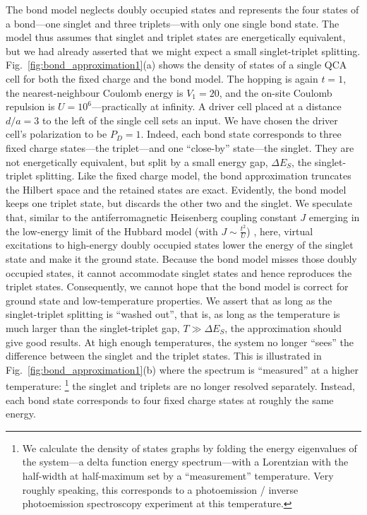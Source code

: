The bond model neglects doubly occupied states and represents the four states of
a bond---one singlet and three triplets---with only one single bond state. The
model thus assumes that singlet and triplet states are energetically equivalent,
but we had already asserted that we might expect a small singlet-triplet
splitting. Fig.~\ref{fig:bond_approximation1}(a) shows the density of states of
a single QCA cell for both the fixed charge and the bond model. The hopping is
again $t=1$, the nearest-neighbour Coulomb energy is $V_1 = 20$, and the on-site
Coulomb repulsion is $U = 10^6$---practically at infinity. A driver cell placed
at a distance $d/a = 3$ to the left of the single cell sets an input. We have
chosen the driver cell's polarization to be $P_D = 1$. Indeed, each bond state
corresponds to three fixed charge states---the triplet---and one ``close-by''
state---the singlet. They are not energetically equivalent, but split by a small
energy gap, $\Delta E_S$, the singlet-triplet splitting. Like the fixed charge
model, the bond approximation truncates the Hilbert space and the retained
states are exact. Evidently, the bond model keeps one triplet state, but
discards the other two and the singlet. We speculate that, similar to the
antiferromagnetic Heisenberg coupling constant $J$ emerging in the low-energy
limit of the Hubbard model (with $J \sim \frac{t^2}{U}$) \cite{Auerbach}, here,
virtual excitations to high-energy doubly occupied states lower the energy of
the singlet state and make it the ground state. Because the bond model misses
those doubly occupied states, it cannot accommodate singlet states and hence
reproduces the triplet states. Consequently, we cannot hope that the bond model
is correct for ground state and low-temperature properties. We assert that as
long as the singlet-triplet splitting is ``washed out'', that is, as long as the
temperature is much larger than the singlet-triplet gap, $T \gg \Delta E_S$, the
approximation should give good results. At high enough temperatures, the system
no longer ``sees'' the difference between the singlet and the triplet states.
This is illustrated in Fig.~\ref{fig:bond_approximation1}(b) where the spectrum
is ``measured'' at a higher temperature:%
%
\footnote{
We calculate the density of states graphs by folding the energy
eigenvalues of the system---a delta function energy spectrum---with a Lorentzian
with the half-width at half-maximum set by a ``measurement'' temperature. Very
roughly speaking, this corresponds to a photoemission / inverse photoemission
spectroscopy experiment at this temperature.
}%
%
the singlet and triplets are no longer resolved separately. Instead, each bond
state corresponds to four fixed charge states at roughly the same energy.

